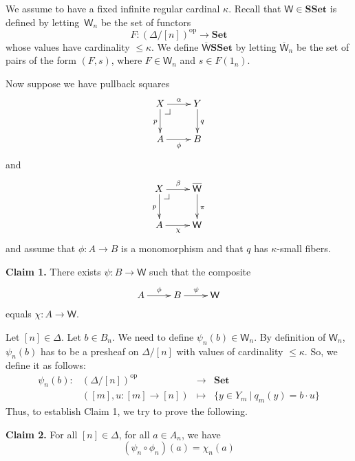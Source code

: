 \documentclass[reqno,10pt,a4paper,oneside]{amsart}
\date{March 25th, 2015}
\makeatletter
\newcommand{\xycenter}[1]{\vcenter{\hbox{\xymatrix{#1}}}}
\newcommand{\drpullback}[1][dr]{\save*!/#1-1.2pc/#1:(-1,1)@^{|-}\restore}
\theoremstyle{definition}
\newcommand{\co}{\colon}
\newcommand{\op}{\mathrm{op}}
\newcommand{\SSet}{\mathbf{SSet}}
\newcommand{\UU}{\overline{\mathsf{W}}}
\newcommand{\U}{\mathsf{W}}
\newcommand{\Set}{\mathbf{Set}}
\makeatother
\begin{document}
We assume to have a fixed infinite regular cardinal $\kappa$. Recall that $\U \in \SSet$ is defined by letting~$\U_n$ be the set of functors
\[
F \co (\Delta/[n])^\op \to \Set
\]
whose values have cardinality $\leq \kappa$.  We define $\UU  \SSet$ by letting $\UU_n$ be the set of pairs of the form $(F, s)$, where $F \in \U_n$ and $s \in F(1_n)$.

Now suppose we have pullback squares
\begin{equation}
\label{equ:pbk1}
\xycenter{
X \ar[r]^{\alpha} \ar[d]_{p} \drpullback & Y \ar[d]^{q} \\
A \ar[r]_{\phi} & B } 
\end{equation}
and
\begin{equation}
\label{equ:pbk2}
\xycenter{
X \ar[d]_p \ar[r]^{\beta} \drpullback & \UU \ar[d]^{\pi} \\
A \ar[r]_{\chi} & \U }
\end{equation}
and assume that $\phi \co A \to B$ is a monomorphism and that $q$ has $\kappa$-small fibers. 

{\bf Claim 1.} There exists $\psi \co B \to \U$ such that the composite
\[
\xymatrix{ A\ar[r]^\phi & B \ar[r]^\psi & \U }
\]
equals $\chi \co A \to \U$.

Let $[n] \in \Delta$. Let $b \in B_n$. We need to define $\psi_n(b) \in \U_n$. By definition of $\U_n$, $\psi_n(b)$
has to be a presheaf on $\Delta/[n]$ with values of cardinality $\leq \kappa$. So, we define it as follows:
\begin{equation}
\label{equ:psi}
\begin{array}{cccl}
\psi_n(b) \co & (\Delta/[n])^\op & \longrightarrow & \Set \\[2ex]
 & ([m], u \co [m] \to [n])  & \longmapsto & \{ y \in Y_m \ | \ q_m(y) = b \cdot u \}
 \end{array}
 \end{equation}
 Thus, to establish Claim 1, we try to prove the following.
 
 {\bf Claim 2. } For all $[n] \in \Delta$, for all $a \in A_n$, we have
 \[
  (\psi_n \circ \phi_n)(a) = \chi_n(a)
  \]
  
  
  
\end{document}
